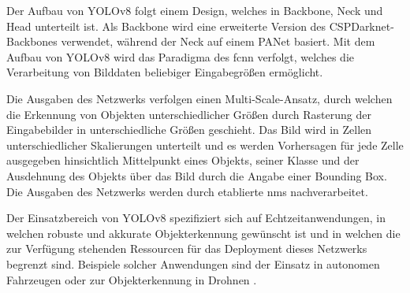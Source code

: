Der Aufbau von YOLOv8 folgt einem Design, welches in Backbone, Neck und Head unterteilt ist. Als Backbone wird eine erweiterte Version des CSPDarknet-Backbones verwendet, während der Neck auf einem PANet basiert. Mit dem Aufbau von YOLOv8 wird das Paradigma des \acf{fcnn} verfolgt, welches die Verarbeitung von Bilddaten beliebiger Eingabegrößen ermöglicht.

Die Ausgaben des Netzwerks verfolgen einen Multi-Scale-Ansatz, durch welchen die Erkennung von Objekten unterschiedlicher Größen durch Rasterung der Eingabebilder in unterschiedliche Größen geschieht. Das Bild wird in Zellen unterschiedlicher Skalierungen unterteilt und es werden Vorhersagen für jede Zelle ausgegeben hinsichtlich Mittelpunkt eines Objekts, seiner Klasse und der Ausdehnung des Objekts über das Bild durch die Angabe einer Bounding Box. Die Ausgaben des Netzwerks werden durch etablierte \ac{nms} nachverarbeitet.

Der Einsatzbereich von YOLOv8 spezifiziert sich auf Echtzeitanwendungen, in welchen robuste und akkurate Objekterkennung gewünscht ist und in welchen die zur Verfügung stehenden Ressourcen für das Deployment dieses Netzwerks begrenzt sind. Beispiele solcher Anwendungen sind der Einsatz in autonomen Fahrzeugen oder zur Objekterkennung in Drohnen \cite{yolov8_car,yolov8_drone}.

